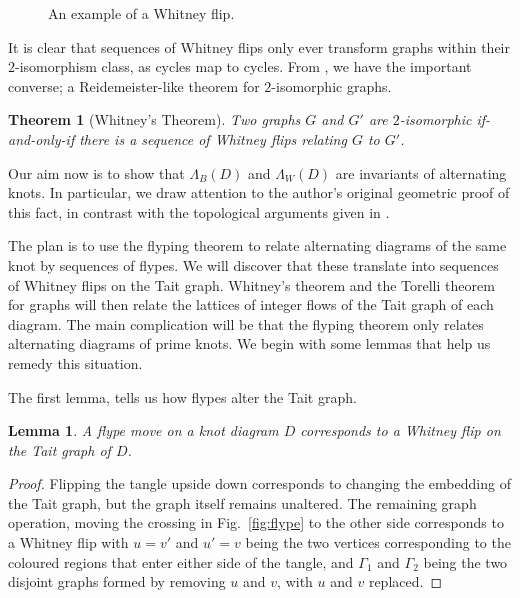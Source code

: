 \documentclass[12pt]{report}
\newtheorem*{theorem}{Theorem}
\newtheorem*{lemma}{Lemma}
\theoremstyle{upright}
\begin{document}
\begin{figure}[hbt!]
	\centering
	\def\svgscale{0.5}
	
	
	\caption{An example of a Whitney flip.}
	\label{fig:whitney_flip}
\end{figure}

It is clear that sequences of Whitney flips only ever transform graphs within their $2$-isomorphism class, as cycles map to cycles. From \cite{2-isomorphic-graphs}, we have the important converse; a Reidemeister-like theorem for $2$-isomorphic graphs.

\begin{theorem}[Whitney's Theorem]
Two graphs $G$ and $G'$ are $2$-isomorphic if-and-only-if there is a sequence of Whitney flips relating $G$ to $G'$.
\end{theorem}

Our aim now is to show that $\Lambda_{B}(D)$ and $\Lambda_{W}(D)$ are invariants of alternating knots.  In particular, we draw attention to the author's original geometric proof of this fact, in contrast with the topological arguments given in \cite{lattices-graphs-mutation}.

The plan is to use the flyping theorem to relate alternating diagrams of the same knot by sequences of flypes.  We will discover that these translate into sequences of Whitney flips on the Tait graph. Whitney's theorem and the Torelli theorem for graphs will then relate the lattices of integer flows of the Tait graph of each diagram. The main complication will be that the flyping theorem only relates alternating diagrams of prime knots. We begin with some lemmas that help us remedy this situation.

The first lemma, tells us how flypes alter the Tait graph.

\begin{lemma}
	A flype move on a knot diagram $D$ corresponds to a Whitney flip on the Tait graph of $D$.
\end{lemma}

\begin{proof}
	Flipping the tangle upside down corresponds to changing the embedding of the Tait graph, but the graph itself remains unaltered. The remaining graph operation, moving the crossing in Fig.~\ref{fig:flype} to the other side corresponds to a Whitney flip with $u = v'$ and $u' = v$ being the two vertices corresponding to the coloured regions that enter either side of the tangle, and $\Gamma_{1}$ and $\Gamma_{2}$ being the two disjoint graphs formed by removing $u$ and $v$, with $u$ and $v$ replaced.
\end{proof}
\end{document}
